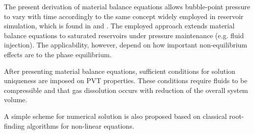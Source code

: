 \documentclass[authoryear,preprint,review,12pt]{elsarticle}
\begin{document}


The present derivation of material balance equations allows bubble-point pressure to vary with time accordingly to the same concept widely employed in reservoir simulation, which is found in \cite{aziz1979petroleum} and \cite{ertekin2001basic}. The employed approach extends material balance equations to saturated reservoirs under pressure maintenance (e.g. fluid injection). The applicability, however, depend on how important non-equilibrium effects are to the phase equilibrium.


After presenting material balance equations, sufficient conditions for solution uniqueness are imposed on PVT properties. These conditions require fluids to be compressible and that gas dissolution occurs with reduction of the overall system volume.

A simple scheme for numerical solution is also proposed based on classical root-finding algorithms for non-linear equations.
\end{document}
